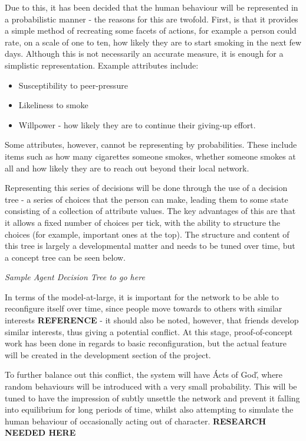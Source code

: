 \documentclass[]{article}
\begin{document}
Due to this, it has been decided that the human behaviour will be represented in a probabilistic manner - the reasons for this are twofold. First, is that it provides a simple method of recreating some facets of actions, for example a person could rate, on a scale of one to ten, how likely they are to start smoking in the next few days. Although this is not necessarily an accurate measure, it is enough for a simplistic representation. Example attributes include:

\begin{itemize}
\item Susceptibility to peer-pressure
\item Likeliness to smoke
\item Willpower - how likely they are to continue their giving-up effort.
\end{itemize}

Some attributes, however, cannot be representing by probabilities. These include items such as how many cigarettes someone smokes, whether someone smokes at all and how likely they are to reach out beyond their local network.

Representing this series of decisions will be done through the use of a decision tree - a series of choices that the person can make, leading them to some state consisting of a collection of attribute values. The key advantages of this are that it allows a fixed number of choices per tick, with the ability to structure the choices (for example, important ones at the top). The structure and content of this tree is largely a developmental matter and needs to be tuned over time, but a concept tree can be seen below.

\emph{Sample Agent Decision Tree to go here}

In terms of the model-at-large, it is important for the network to be able to reconfigure itself over time, since people move towards to others with similar interests {\bf REFERENCE} - it should also be noted, however, that friends develop similar interests, thus giving a potential conflict. At this stage, proof-of-concept work has been done in regards to basic reconfiguration, but the actual feature will be created in the development section of the project. 

To further balance out this conflict, the system will have \'Acts of God\', where random behaviours will be introduced with a very small probability. This will be tuned to have the impression of subtly unsettle the network and prevent it falling into equilibrium for long periods of time, whilst also attempting to simulate the human behaviour of occasionally acting out of character. {\bf RESEARCH NEEDED HERE}
\end{document}
